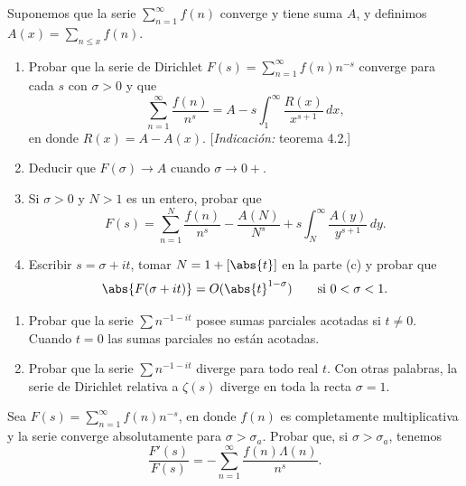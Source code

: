 \documentclass[12pt,a4paper]{book}
\begin{document}
    \begin{ejercicio}
        Suponemos que la serie $\sum_{n=1}^{\infty}f(n)$ converge y tiene suma $A$, y
        definimos $A(x)=\sum_{n\leq x}f(n)$.
        \begin{enumerate}
            \item[(a)] Probar que la serie de Dirichlet $F(s)=\sum_{n=1}^{\infty}f(n)n^{-s}$
            converge para cada $s$ con $\sigma>0$ y que
            \begin{equation*}
                \sum_{n=1}^{\infty}\frac{f(n)}{n^{s}}=A-s\int_{1}^{\infty}\frac{R(x)}{x^{s+1}}\,dx,
            \end{equation*}
            en donde $R(x)=A-A(x)$. [\textit{Indicación:} teorema 4.2.]
            \item[(b)] Deducir que $F(\sigma)\to A$ cuando $\sigma\to0+$.
            \item[(c)] Si $\sigma>0$ y $N>1$ es un entero, probar que
            \begin{equation*}
                F(s)=\sum_{n=1}^{N}\frac{f(n)}{n^{s}}-\frac{A(N)}{N^{s}}+s\int_{N}^{\infty}\frac{A(y)}{y^{s+1}}\,dy.
            \end{equation*}
            \item[(d)] Escribir $s=\sigma+it$, tomar $N=1+[\abs{t}]$ en la parte (c) y probar que
            \begin{equation*}
                \abs{F(\sigma+it)}=O(\abs{t}^{1-\sigma})\qquad\text{si }0<\sigma<1.
            \end{equation*}
        \end{enumerate}
    \end{ejercicio}

    \begin{ejercicio}
        \begin{enumerate}
            \item[(a)] Probar que la serie $\sum n^{-1-it}$ posee sumas parciales acotadas si
            $t\neq0$. Cuando $t=0$ las sumas parciales no están acotadas.
            \item[(b)] Probar que la serie $\sum n^{-1-it}$ diverge para todo real $t$. Con
            otras palabras, la serie de Dirichlet relativa a $\zeta(s)$ diverge en toda la
            recta $\sigma=1$.
        \end{enumerate}
    \end{ejercicio}

    \begin{ejercicio}
        Sea $F(s)=\sum_{n=1}^{\infty}f(n)n^{-s}$, en donde $f(n)$ es completamente
        multiplicativa y la serie converge absolutamente para $\sigma>\sigma_{a}$. Probar que, si
        $\sigma>\sigma_{a}$, tenemos
        \begin{equation*}
            \frac{F'(s)}{F(s)}=-\sum_{n=1}^{\infty}\frac{f(n)\Lambda(n)}{n^{s}}.
        \end{equation*}
    \end{ejercicio}
\end{document}
